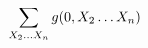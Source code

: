 \documentclass[preview]{standalone}
\begin{document}
\begin{align*}
\special{dvisvgm:raw <g id='unique000'>}\sum_{X_2\ldots X_n} g(0, X_2\ldots X_n)\special{dvisvgm:raw </g>}
\end{align*}
\end{document}
